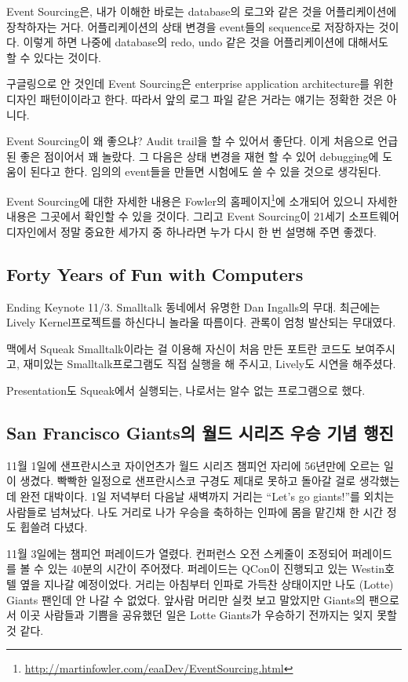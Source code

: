 \documentclass[11pt]{article}
\begin{document}
Event Sourcing은, 내가 이해한 바로는 database의 로그와 같은 것을
어플리케이션에 장착하자는 거다. 어플리케이션의 상태 변경을 event들의
sequence로 저장하자는 것이다. 이렇게 하면 나중에 database의 redo, undo
같은 것을 어플리케이션에 대해서도 할 수 있다는 것이다.
 
구글링으로 안 것인데 Event Sourcing은 enterprise application
architecture를 위한 디자인 패턴이이라고 한다. 따라서 앞의 로그 파일
같은 거라는 얘기는 정확한 것은 아니다.
 
Event Sourcing이 왜 좋으냐? Audit trail을 할 수 있어서 좋단다. 
이게 처음으로 언급된
좋은 점이어서 꽤 놀랐다. 그 다음은 상태 변경을 재현 할 수 있어
debugging에 도움이 된다고 한다. 임의의 event들을 만들면 시험에도 쓸 수
있을 것으로 생각된다.
 
Event Sourcing에 대한 자세한 내용은 Fowler의 
홈페이지\footnote{\url{http://martinfowler.com/eaaDev/EventSourcing.html}}에 
소개되어 있으니 자세한 내용은 그곳에서 확인할 수 있을 것이다.
그리고 Event Sourcing이 21세기 소프트웨어 디자인에서 정말 중요한 세가지 중 
하나라면 누가 다시 한 번 설명해 주면 좋겠다.

\subsection{Forty Years of Fun with Computers}

Ending Keynote 11/3. Smalltalk 동네에서 유명한 Dan Ingalls의 무대.
최근에는 Lively Kernel프로젝트를 하신다니 놀라울 따름이다.
관록이 엄청 발산되는 무대였다.
 
맥에서 Squeak Smalltalk이라는 걸 이용해 자신이 처음 만든 포트란 코드도
보여주시고, 재미있는 Smalltalk프로그램도 직접 실행을 해 주시고,
Lively도 시연을 해주셨다.
 
Presentation도 Squeak에서 실행되는, 나로서는 알수 없는 프로그램으로 했다.

\subsection{San Francisco Giants의 월드 시리즈 우승 기념 행진}

11월 1일에 샌프란시스코 자이언츠가 월드 시리즈 챔피언 자리에
56년만에 오르는 일이 생겼다. 빡빡한 일정으로 샌프란시스코 구경도 제대로
못하고 돌아갈 걸로 생각했는데 완전 대박이다. 1일 저녁부터 다음날 새벽까지 
거리는 ``Let's go giants!''를 외치는 사람들로 넘쳐났다. 나도 거리로 나가
우승을 축하하는 인파에 몸을 맡긴채 한 시간 정도 휩쓸려 다녔다. 

11월 3일에는 챔피언 퍼레이드가 열렸다. 컨퍼런스 오전 스케줄이 조정되어 
퍼레이드를 볼 수 있는 40분의 시간이 주어졌다.  
퍼레이드는 QCon이 진행되고 있는 Westin호텔 옆을 지나갈 예정이었다.
거리는 아침부터 인파로 가득찬 상태이지만 나도 (Lotte) Giants 팬인데 안
나갈 수 없었다. 앞사람 머리만 실컷 보고 말았지만 Giants의 팬으로서 
이곳 사람들과 기쁨을 공유했던 일은 Lotte Giants가 우승하기 전까지는 잊지
못할 것 같다.

\pagebreak



\end{document}
